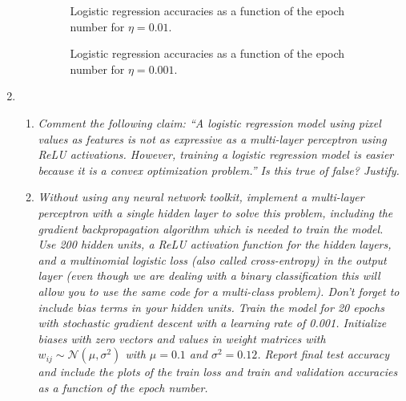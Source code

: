 \documentclass[12pt]{article}
\begin{document}
\begin{enumerate}[leftmargin=\labelsep]
\begin{enumerate}[label=\alph*)]
                    \begin{figure}[H]
                        \centering
                        
                        \caption{Logistic regression accuracies as a function of the epoch number for $\eta = 0.01$.}
                        \label{fig:logistic-50-0.01}
                    \end{figure}

                    \begin{figure}[H]
                        \centering
                        
                        \caption{Logistic regression accuracies as a function of the epoch number for $\eta = 0.001$.}
                        \label{fig:logistic-50-0.001}
                    \end{figure}

          \end{enumerate}

    \item

          \begin{enumerate}[label=\alph*)]

              \item \textit{Comment the following claim: “A logistic regression model using pixel values
                        as features is not as expressive as a multi-layer perceptron using ReLU activations.
                        However, training a logistic regression model is easier because it is a convex optimization
                        problem.” Is this true of false? Justify.}

                    \vspace{12pt}

              \item \textit{Without using any neural network toolkit, implement a multi-layer
                        perceptron with a single hidden layer to solve this problem, including the gradient
                        backpropagation algorithm which is needed to train the model. Use 200 hidden units,
                        a ReLU activation function for the hidden layers, and a multinomial logistic loss (also
                        called cross-entropy) in the output layer (even though we are dealing with a binary
                        classification this will allow you to use the same code for a multi-class problem). Don’t
                        forget to include bias terms in your hidden units. Train the model for 20 epochs with
                        stochastic gradient descent with a learning rate of 0.001. Initialize biases with zero
                        vectors and values in weight matrices with $w_{ij} \sim \mathcal{N}(\mu, \sigma^2)$ with $\mu = 0.1$ and $\sigma^2 = 0.12$. Report final test accuracy and include the plots of the train loss and train and validation
                        accuracies as a function of the epoch number.
                    }


\end{enumerate}
\end{enumerate}
\end{document}
